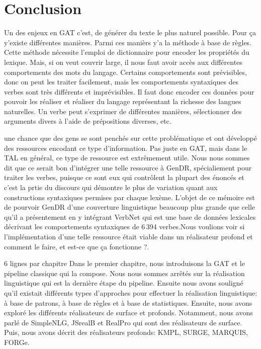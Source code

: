 
\chapter*{Conclusion}
Un des enjeux en GAT c'est, de générer du texte le plus naturel possible. Pour ça y'existe différentes manières. Parmi ces manièrs y'a la méthode à base de règles. Cette méthode nécessite l'emploi de dictionnaire pour encoder les propriétés du lexique. Mais, si on veut couvrir large, il nous faut avoir accès aux différentes comportements des mots du langage. Certains comportements sont prévisibles, donc on peut les traiter facilement, mais les comportements syntaxiques des verbes sont très différents et imprévisibles. Il faut donc encoder ces données pour pouvoir les réaliser et réaliser du langage représentant la richesse des langues naturelles. Un verbe peut s'exprimer de différentes manières, sélectionner des arguments divers à l'aide de prépositions diverses, etc. 

une chance que des gens se sont penchés sur cette problématique et ont développé des ressources encodant ce type d'information. Pas juste en GAT, mais dans le TAL en général, ce type de ressource est extrêmement utile. Nous nous sommes dit que ce serait bon d'intégrer une telle ressource à GenDR, spécialiement pour traiter les verbes, puisque ce sont eux qui contrôlent la plupart des énoncés et c'est la prtie du discours qui démontre le plus de variation quant aux constructions syntaxiques permises par chaque lexème. L'objet de ce mémoire est de pourvoir GenDR d'une couverture linguistique beaucoup plus grande que celle qu'il a présentement en y intégrant VerbNet qui est une base de données lexicales décrivant les comportements syntaxiques de 6\,394 verbes.Nous voulions voir si l'implémentation d'une telle ressource était viable dans un réalisateur profond et comment le faire, et est-ce que ça fonctionne ?.

6 lignes par chapitre
Dans le premier chapitre, nous introduisons la \ac{GAT} et le pipeline classique qui la compose. Nous nous sommes arrêtés sur la réalisation linguistique qui est la dernière étape du pipeline. Ensuite nous avons souligné qu'il existait différents types d'approches pour effectuer la réalisation linguistique: à base de patrons, à base de règles et à base de statistiques. Ensuite, nous avons exploré les différents réalisateurs de surface et profonds. Notamment, nous avons parlé de SimpleNLG, JSrealB et RealPro qui sont des réalisateurs de surface. Puis, nous avons décrit des réalisateurs profonds: KMPL, SURGE, MARQUIS, FORGe.

